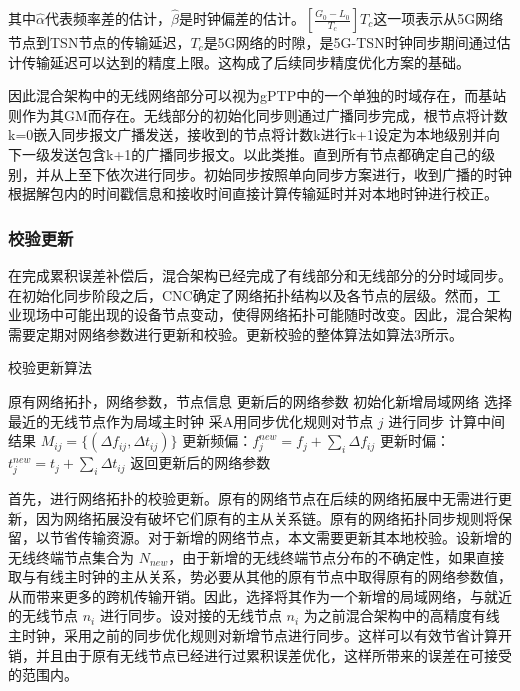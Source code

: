 \documentclass[UTF8,a4paper,12pt]{ctexart}
\numberwithin{equation}{section}
\begin{document}
其中$\widehat{\alpha}$代表频率差的估计，$\widehat{\beta}$是时钟偏差的估计。$[\frac{G_0-L_0}{T_c}]T_c$这一项表示从5G网络节点到TSN节点的传输延迟，$T_c$是5G网络的时隙，是5G-TSN时钟同步期间通过估计传输延迟可以达到的精度上限。这构成了后续同步精度优化方案的基础。

因此混合架构中的无线网络部分可以视为gPTP中的一个单独的时域存在，而基站则作为其GM而存在。无线部分的初始化同步则通过广播同步完成，根节点将计数k=0嵌入同步报文广播发送，接收到的节点将计数k进行k+1设定为本地级别并向下一级发送包含k+1的广播同步报文。以此类推。直到所有节点都确定自己的级别，并从上至下依次进行同步。初始同步按照单向同步方案进行，收到广播的时钟根据解包内的时间戳信息和接收时间直接计算传输延时并对本地时钟进行校正。

\subsubsection{校验更新}
在完成累积误差补偿后，混合架构已经完成了有线部分和无线部分的分时域同步。在初始化同步阶段之后，CNC确定了网络拓扑结构以及各节点的层级。然而，工业现场中可能出现的设备节点变动，使得网络拓扑可能随时改变。因此，混合架构需要定期对网络参数进行更新和校验。更新校验的整体算法如算法3所示。
\begin{algorithm}
	\caption{校验更新算法}
	\begin{algorithmic}[1]
		\REQUIRE
		原有网络拓扑，网络参数，节点信息
		\ENSURE
		更新后的网络参数
		\STATE 初始化新增局域网络
		\STATE 选择最近的无线节点作为局域主时钟
		\STATE 采A用同步优化规则对节点 $j$ 进行同步
		\ENDFOR
		\STATE 计算中间结果 $M_{ij} = \{(\Delta f_{ij}, \Delta t_{ij})\}$
		\STATE 更新频偏：$f_j^{new} = f_j + \sum_{i} \Delta f_{ij}$
		\STATE 更新时偏：$t_j^{new} = t_j + \sum_{i} \Delta t_{ij}$
		\ENDFOR
		\STATE 返回更新后的网络参数
	\end{algorithmic}
\end{algorithm}
首先，进行网络拓扑的校验更新。原有的网络节点在后续的网络拓展中无需进行更新，因为网络拓展没有破坏它们原有的主从关系链。原有的网络拓扑同步规则将保留，以节省传输资源。对于新增的网络节点，本文需要更新其本地校验。设新增的无线终端节点集合为 $N_{new}$，由于新增的无线终端节点分布的不确定性，如果直接取与有线主时钟的主从关系，势必要从其他的原有节点中取得原有的网络参数值，从而带来更多的跨机传输开销。因此，选择将其作为一个新增的局域网络，与就近的无线节点 $n_i$ 进行同步。设对接的无线节点 $n_i$ 为之前混合架构中的高精度有线主时钟，采用之前的同步优化规则对新增节点进行同步。这样可以有效节省计算开销，并且由于原有无线节点已经进行过累积误差优化，这样所带来的误差在可接受的范围内。
\end{document}
